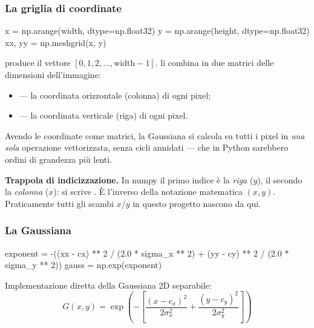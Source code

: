 \subsubsection{La griglia di coordinate}

\begin{idebox}
\begin{pycode}
x = np.arange(width, dtype=np.float32)
y = np.arange(height, dtype=np.float32)
xx, yy = np.meshgrid(x, y)
\end{pycode}
\end{idebox}

 produce il vettore $[0, 1, 2, \ldots, \text{width}-1]$.
 li combina in due matrici delle dimensioni dell'immagine:

\begin{itemize}
  \item {} --- la coordinata orizzontale (colonna) di ogni pixel;
  \item {} --- la coordinata verticale (riga) di ogni pixel.
\end{itemize}

Avendo le coordinate come matrici, la Gaussiana si calcola su tutti i pixel in \emph{una sola}
operazione vettorizzata, senza cicli  annidati --- che in Python sarebbero ordini di
grandezza più lenti.

\begin{attenzione}
\textbf{Trappola di indicizzazione.} In numpy il primo indice è la \emph{riga} ($y$), il secondo
la \emph{colonna} ($x$): si scrive . È l'inverso della notazione matematica
$(x, y)$. Praticamente tutti gli scambi $x$/$y$ in questo progetto nascono da qui.
\end{attenzione}

\subsubsection{La Gaussiana}

\begin{idebox}
\begin{pycode}
exponent = -((xx - cx) ** 2 / (2.0 * sigma_x ** 2)
             + (yy - cy) ** 2 / (2.0 * sigma_y ** 2))
gauss = np.exp(exponent)
\end{pycode}
\end{idebox}

Implementazione diretta della Gaussiana 2D separabile:
\[
G(x,y) = \exp\!\left(-\left[\frac{(x-c_x)^2}{2\sigma_x^2} + \frac{(y-c_y)^2}{2\sigma_y^2}\right]\right)
\]

